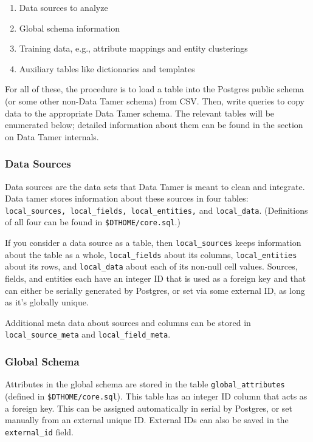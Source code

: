\begin{enumerate}
\item Data sources to analyze
\item Global schema information
\item Training data, e.g., attribute mappings and entity clusterings
\item Auxiliary tables like dictionaries and templates
\end{enumerate}

For all of these, the procedure is to load a table into the Postgres public schema (or some other non-Data Tamer schema) from CSV.  Then, write queries to copy data to the appropriate Data Tamer schema.  The relevant tables will be enumerated below; detailed information about them can be found in the section on Data Tamer internals.

\subsubsection{Data Sources}

Data sources are the data sets that Data Tamer is meant to clean and integrate.  Data tamer stores information about these sources in four tables: \texttt{local\_sources, local\_fields, local\_entities,} and \texttt{local\_data}.  (Definitions of all four can be found in \texttt{\$DTHOME/core.sql}.)

If you consider a data source as a table, then \texttt{local\_sources} keeps information about the table as a whole, \texttt{local\_fields} about its columns, \texttt{local\_entities} about its rows, and \texttt{local\_data} about each of its non-null cell values.  Sources, fields, and entities each have an integer ID that is used as a foreign key and  that can either be serially generated by Postgres, or set via some external ID, as long as it's globally unique.

Additional meta data about sources and columns can be stored in \texttt{local\_source\_meta} and \texttt{local\_field\_meta}.

\subsubsection{Global Schema}

Attributes in the global schema are stored in the table \texttt{global\_attributes} (defined in \texttt{\$DTHOME/core.sql}).  This table has an integer ID column that acts as a foreign key.  This can be assigned automatically in serial by Postgres, or set manually from an external unique ID.  External IDs can also be saved in the \texttt{external\_id} field.

